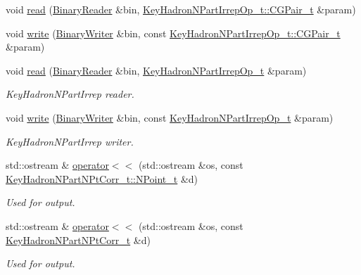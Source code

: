 \begin{DoxyCompactItemize}
\item 
void \mbox{\hyperlink{namespaceHadron_a0567f3fb8f2db68b0a93251138c13a62}{read}} (\mbox{\hyperlink{classADATIO_1_1BinaryReader}{Binary\+Reader}} \&bin, \mbox{\hyperlink{structHadron_1_1KeyHadronNPartIrrepOp__t_1_1CGPair__t}{Key\+Hadron\+N\+Part\+Irrep\+Op\+\_\+t\+::\+C\+G\+Pair\+\_\+t}} \&param)
\item 
void \mbox{\hyperlink{namespaceHadron_aa05ac649ec39cb98483ab55274129758}{write}} (\mbox{\hyperlink{classADATIO_1_1BinaryWriter}{Binary\+Writer}} \&bin, const \mbox{\hyperlink{structHadron_1_1KeyHadronNPartIrrepOp__t_1_1CGPair__t}{Key\+Hadron\+N\+Part\+Irrep\+Op\+\_\+t\+::\+C\+G\+Pair\+\_\+t}} \&param)
\item 
void \mbox{\hyperlink{namespaceHadron_a205a666e574892fd5fc22e723a24399e}{read}} (\mbox{\hyperlink{classADATIO_1_1BinaryReader}{Binary\+Reader}} \&bin, \mbox{\hyperlink{structHadron_1_1KeyHadronNPartIrrepOp__t}{Key\+Hadron\+N\+Part\+Irrep\+Op\+\_\+t}} \&param)
\begin{DoxyCompactList}\small\item\em Key\+Hadron\+N\+Part\+Irrep reader. \end{DoxyCompactList}\item 
void \mbox{\hyperlink{namespaceHadron_aa056cb1973613af20ddde740db299944}{write}} (\mbox{\hyperlink{classADATIO_1_1BinaryWriter}{Binary\+Writer}} \&bin, const \mbox{\hyperlink{structHadron_1_1KeyHadronNPartIrrepOp__t}{Key\+Hadron\+N\+Part\+Irrep\+Op\+\_\+t}} \&param)
\begin{DoxyCompactList}\small\item\em Key\+Hadron\+N\+Part\+Irrep writer. \end{DoxyCompactList}\item 
std\+::ostream \& \mbox{\hyperlink{namespaceHadron_aa96f2bb0448730889b5e59a58a1a62dd}{operator$<$$<$}} (std\+::ostream \&os, const \mbox{\hyperlink{structHadron_1_1KeyHadronNPartNPtCorr__t_1_1NPoint__t}{Key\+Hadron\+N\+Part\+N\+Pt\+Corr\+\_\+t\+::\+N\+Point\+\_\+t}} \&d)
\begin{DoxyCompactList}\small\item\em Used for output. \end{DoxyCompactList}\item 
std\+::ostream \& \mbox{\hyperlink{namespaceHadron_aa874bbfadc5859a87766ccbd07b10f48}{operator$<$$<$}} (std\+::ostream \&os, const \mbox{\hyperlink{structHadron_1_1KeyHadronNPartNPtCorr__t}{Key\+Hadron\+N\+Part\+N\+Pt\+Corr\+\_\+t}} \&d)
\begin{DoxyCompactList}\small\item\em Used for output. \end{DoxyCompactList}\item 

\end{DoxyCompactItemize}

